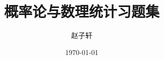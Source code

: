 \documentclass[11pt, fontset=windows]{MyBeautybook-CN}
\begin{document}
    \title{\Huge{\textbf{概率论与数理统计习题集}}} %
    \author{赵子轩} %
    \date{\today} %
    \linespread{1.5}
    \maketitle
    \thispagestyle{empty}

    \frontmatter
    \tableofcontents
    \newpage
    \thispagestyle{empty}

    \mainmatter

    
\end{document}
